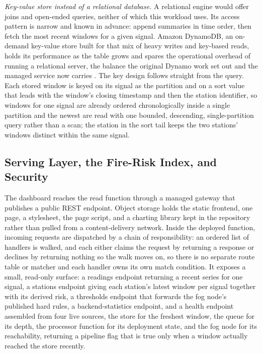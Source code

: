 \documentclass[conference]{IEEEtran}
\begin{document}
\textit{Key-value store instead of a relational database.} A relational engine would offer joins and open-ended queries, neither of which this workload uses. Its access pattern is narrow and known in advance: append summaries in time order, then fetch the most recent windows for a given signal. Amazon DynamoDB, an on-demand key-value store built for that mix of heavy writes and key-based reads, holds its performance as the table grows and spares the operational overhead of running a relational server, the balance the original Dynamo work set out and the managed service now carries \cite{decandia2007, elhemali2022}. The key design follows straight from the query. Each stored window is keyed on its signal as the partition and on a sort value that leads with the window's closing timestamp and then the station identifier, so windows for one signal are already ordered chronologically inside a single partition and the newest are read with one bounded, descending, single-partition query rather than a scan; the station in the sort tail keeps the two stations' windows distinct within the same signal.

\subsection{Serving Layer, the Fire-Risk Index, and Security}

The dashboard reaches the read function through a managed gateway that publishes a public REST endpoint. Object storage holds the static frontend, one page, a stylesheet, the page script, and a charting library kept in the repository rather than pulled from a content-delivery network. Inside the deployed function, incoming requests are dispatched by a chain of responsibility: an ordered list of handlers is walked, and each either claims the request by returning a response or declines by returning nothing so the walk moves on, so there is no separate route table or matcher and each handler owns its own match condition. It exposes a small, read-only surface: a readings endpoint returning a recent series for one signal, a stations endpoint giving each station's latest window per signal together with its derived risk, a thresholds endpoint that forwards the fog node's published hard rules, a backend-statistics endpoint, and a health endpoint assembled from four live sources, the store for the freshest window, the queue for its depth, the processor function for its deployment state, and the fog node for its reachability, returning a pipeline flag that is true only when a window actually reached the store recently.
\end{document}
